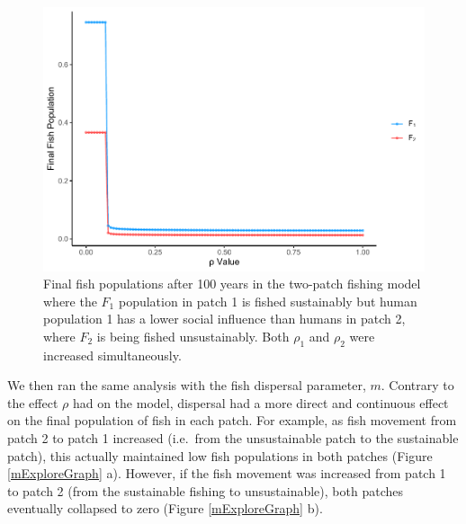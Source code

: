 \documentclass[
]{article}
\begin{document}
\begin{figure}
\centering
\includegraphics{Wulfing_Thesis_files/figure-latex/rhoExploreGraph-1.pdf}
\caption{\label{fig:rhoExploreGraph}Final fish populations after 100 years in the two-patch fishing model where the \(F_1\) population in patch 1 is fished sustainably but human population 1 has a lower social influence than humans in patch 2, where \(F_2\) is being fished unsustainably. Both \(\rho_1\) and \(\rho_2\) were increased simultaneously. \label{rhoExploreGraph}}
\end{figure}

We then ran the same analysis with the fish dispersal parameter, \(m\). Contrary to the effect \(\rho\) had on the model, dispersal had a more direct and continuous effect on the final population of fish in each patch. For example, as fish movement from patch 2 to patch 1 increased (i.e.~from the unsustainable patch to the sustainable patch), this actually maintained low fish populations in both patches (Figure \ref{mExploreGraph} a). However, if the fish movement was increased from patch 1 to patch 2 (from the sustainable fishing to unsustainable), both patches eventually collapsed to zero (Figure \ref{mExploreGraph} b).
\end{document}
